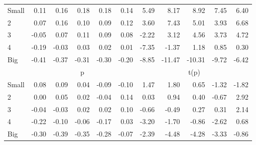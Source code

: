 \begin{table}[!ht]
\begin{tabular}{lrrrrrrrrrr}
    \\
      \cmidrule(r){2-6} \cmidrule(r){7-11}

    Small   & 0.11  & 0.16  & 0.18  & 0.18  & 0.14  & 5.49  & 8.17  & 8.92  & 7.45  & 6.40  \\
         2  & 0.07  & 0.16  & 0.10  & 0.09  & 0.12  & 3.60  & 7.43  & 5.01  & 3.93  & 6.68  \\
         3  & -0.05  & 0.07  & 0.11  & 0.09  & 0.08  & -2.22  & 3.12  & 4.56  & 3.73  & 4.72  \\
         4  & -0.19  & -0.03  & 0.03  & 0.02  & 0.01  & -7.35  & -1.37  & 1.18  & 0.85  & 0.30  \\
    Big     & -0.41  & -0.37  & -0.31  & -0.30  & -0.20  & -8.85  & -11.47  & -10.31  & -9.72  & -6.42  \\

  
    
      & \multicolumn{5}{c}{p} & \multicolumn{5}{c}{t(p)}
    
    \\
      \cmidrule(r){2-6} \cmidrule(r){7-11}

    Small   & 0.08  & 0.09  & 0.04  & -0.09  & -0.10  & 1.47  & 1.80  & 0.65  & -1.32  & -1.82  \\
         2  & 0.00  & 0.05  & 0.02  & -0.04  & 0.14  & 0.03  & 0.94  & 0.40  & -0.67  & 2.92  \\
         3  & -0.04  & -0.03  & 0.02  & 0.02  & 0.10  & -0.66  & -0.49  & 0.27  & 0.31  & 2.14  \\
         4  & -0.22  & -0.10  & -0.06  & -0.17  & 0.03  & -3.20  & -1.70  & -0.86  & -2.62  & 0.68  \\
    Big     & -0.30  & -0.39  & -0.35  & -0.28  & -0.07  & -2.39  & -4.48  & -4.28  & -3.33  & -0.86  \\

  

  \bottomrule
\end{tabular}
\label{tbl:25_Size_Var_B2016}
\end{table}